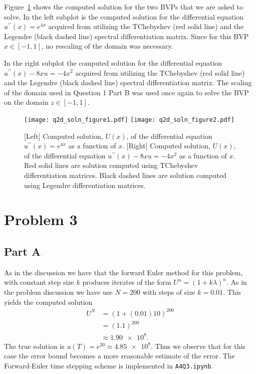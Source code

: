 \documentclass[12pt]{article}
\begin{document}
Figure~\ref{fig:q2d_figure} shows the computed solution for the two BVPs that we are asked to solve. In the left subplot is the computed solution for the differential equation $u^{\prime\prime}(x) = e^{4x}$ acquired from utilizing the TChebyshev (red solid line) and the Legendre (black dashed line) spectral differentiation matrix. Since for this BVP $x\in [-1,1]$, no rescaling of the domain was necessary. 

In the right subplot the computed solution for the differential equation $u^{\prime\prime}(x) - 8xu = -4x^{2}$ acquired from utilizing the TChebyshev (red solid line) and the Legendre (black dashed line) spectral differentiation matrix. The scaling of the domain used in Question 1 Part B was used once again to solve the BVP on the domain $z\in [-1,1]$. 

\begin{figure}[!h]
	\centering
	\texttt{[image: q2d\_soln\_figure1.pdf]}
	\texttt{[image: q2d\_soln\_figure2.pdf]}
	\caption{[Left] Computed solution, $U(x)$, of the differential equation $u^{\prime\prime}(x) = e^{4x}$ as a function of $x$. [Right] Computed solution, $U(x)$, of the differential equation $u^{\prime\prime}(x) - 8xu = -4x^{2}$ as a function of $x$. Red solid lines are solution computed using TChebyshev differentiation matrices. Black dashed lines are solution computed using Legendre differentiation matrices.}
    \label{fig:q2d_figure}
\end{figure}

\section*{Problem 3}

\subsection*{Part A}
As in the discussion we have that the forward Euler method for this problem, with constant step size $k$ produces iterates of the form $U^{n} = (1+k\lambda)^{n}$. As in the problem discussion we have use $N = 200$ with steps of size $k=0.01$. This yields the computed solution 
\begin{subequations}
    \begin{align}
        U^{N} &= (1+(0.01)10)^{200}\\
        &= (1.1)^{200}\\
        &\approx \num{1.90e8}.
    \end{align}
\end{subequations}
The true solution is $u(T) = e^{20} \approx \num{4.85e8}$. Thus we observe that for this case the error bound becomes a more reasonable estimate of the error. The Forward-Euler time stepping scheme is implemented in \verb|A4Q3.ipynb|.
\end{document}
